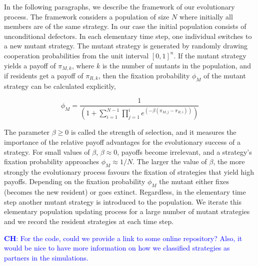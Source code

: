 \documentclass[11pt]{article}
\newcommand{\christian}[1]{\textcolor{blue}{\textbf{CH}: #1}}
\begin{document}
In the following paragraphs, we describe the framework of our evolutionary
process. The framework considers a population of size \(N\) where initially all
members are of the same strategy. In our case the initial population consists of
unconditional defectors. In each elementary time step, one individual switches
to a new mutant strategy. The mutant strategy is generated by randomly drawing
cooperation probabilities from the unit interval \([0,1]^n\). If the mutant
strategy yields a payoff of \(\pi_{M, k}\), where \(k\) is the number of
mutants in the population, and if residents get a payoff of \(\pi_{R,
k}\), then the fixation probability \(\phi_{M}\) of the mutant strategy can be
calculated explicitly,

\begin{equation}\label{eq:fixation_probability}
  \phi_{M} = \frac{1}{\left(1 + \displaystyle \sum_{i=1}^{N - 1} \prod_{j=1}^{i} e^{(- \beta (\pi_{M, j} - \pi_{R, i}))} \right)}
\end{equation}

The parameter \(\beta \geq 0\) is called the strength of selection, and it
measures the importance of the relative payoff advantages for the evolutionary
success of a strategy. For small values of \(\beta\), \(\beta \approx 0\),
payoffs become irrelevant, and a strategy's fixation probability approaches
\(\phi_{M} \approx 1 / N\). The larger the value of \(\beta\), the more strongly
the evolutionary process favours the fixation of strategies that yield high
payoffs.
Depending on the fixation probability \(\phi_{M}\) the mutant either fixes
(becomes the new resident) or goes extinct. Regardless, in the elementary time
step another mutant strategy is introduced to the  population. We iterate this
elementary population updating process for a large number of mutant strategies
and we record the resident strategies at each time step.

\christian{For the code, could we provide a link to some online repository? Also, it would be nice to have more information on how we classified strategies as partners in the simulations.} 

{\setlength{\bibsep}{0\baselineskip}


}


\clearpage
\newpage
\end{document}
